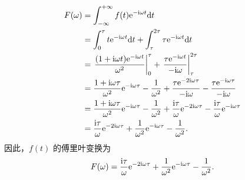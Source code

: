 \begin{solution}
    \begin{align*}
        F(\omega) & = \int_{-\infty}^{+\infty}f(t)\mathrm{e}^{-\mathrm{i}\omega t}\mathrm{d}t \\
        & = \int_{0}^{\tau}t\mathrm{e}^{-\mathrm{i}\omega t}\mathrm{d}t + \int_{\tau}^{2\tau}\tau\mathrm{e}^{-\mathrm{i}\omega t}\mathrm{d}t \\
        & = \left.\frac{(1 +\mathrm{i}\omega t)\mathrm{e}^{-\mathrm{i}\omega t}}{\omega^2}\right|_{0}^{\tau} + \left.\frac{\tau\mathrm{e}^{-\mathrm{i}\omega t}}{-\mathrm{i}\omega}\right|_{\tau}^{2\tau} \\
        & = \frac{1 + \mathrm{i}\omega\tau}{\omega^2}\mathrm{e}^{-\mathrm{i}\omega\tau} - \frac{1}{\omega^2} + \frac{\tau\mathrm{e}^{-2\mathrm{i}\omega\tau}}{-\mathrm{i}\omega} - \frac{\tau\mathrm{e}^{-\mathrm{i}\omega\tau}}{-\mathrm{i}\omega} \\
        & = \frac{1 + \mathrm{i}\omega\tau}{\omega^2}\mathrm{e}^{-\mathrm{i}\omega\tau} - \frac{1}{\omega^2} + \frac{\mathrm{i}\tau}{\omega}\mathrm{e}^{-2\mathrm{i}\omega \tau} - \frac{\mathrm{i}\tau}{\omega}\mathrm{e}^{-\mathrm{i} \omega \tau} \\
        & = \frac{\mathrm{i}\tau}{\omega}\mathrm{e}^{-2\mathrm{i}\omega\tau} + \frac{1}{\omega^2}\mathrm{e}^{-\mathrm{i}\omega\tau} - \frac{1}{\omega^2}.
    \end{align*}
    因此，$f(t)$ 的傅里叶变换为
    \begin{align*}
        F(\omega) = \frac{\mathrm{i}\tau}{\omega}\mathrm{e}^{-2\mathrm{i}\omega\tau} + \frac{1}{\omega^2}\mathrm{e}^{-\mathrm{i}\omega\tau} - \frac{1}{\omega^2}.
    \end{align*}
\end{solution}
